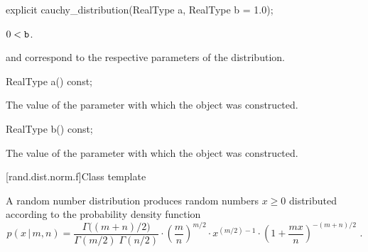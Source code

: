 %
\begin{itemdecl}
explicit cauchy_distribution(RealType a, RealType b = 1.0);
\end{itemdecl}

\begin{itemdescr}
\pnum
\expects
$0 < \texttt{b}$.

\pnum
\remarks
{} and 
correspond to the respective parameters of the distribution.
\end{itemdescr}

%
\begin{itemdecl}
RealType a() const;
\end{itemdecl}

\begin{itemdescr}
\pnum
\returns
The value of the  parameter
 with which the object was constructed.
\end{itemdescr}

%
\begin{itemdecl}
RealType b() const;
\end{itemdecl}

\begin{itemdescr}
\pnum
\returns
The value of the  parameter
 with which the object was constructed.
\end{itemdescr}


[rand.dist.norm.f]{Class template }%
%
%

\pnum
A  random number distribution
produces random numbers $x \ge 0$
distributed according to
the probability density function%
%
%
\[ p(x\,|\,m,n) = \frac{\Gamma\big((m+n)/2\big)}{\Gamma(m/2) \; \Gamma(n/2)}
     \cdot \left(\frac{m}{n}\right)^{m/2}
     \cdot x^{(m/2)-1}
     \cdot \left(1 + \frac{m x}{n}\right)^{-(m + n)/2}
     \text{ .} \]

